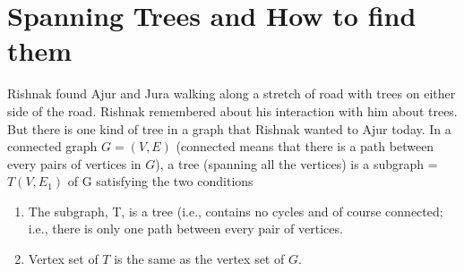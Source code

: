 \chapter{Spanning Trees and How to find them}
Rishnak found Ajur and Jura walking along a stretch of road with trees on either side of the road. Rishnak remembered about his interaction with him about trees. But there is one kind of tree in a graph that Rishnak wanted to Ajur today.
In a connected graph $G=(V,E)$ (connected means that there is a path between every pairs of vertices in $G$), a tree (spanning all the vertices) is a subgraph =$T(V,E_1)$ of G satisfying the two conditions
\begin{enumerate}
    \item The subgraph, T,  is a tree (i.e., contains no cycles and of course connected; i.e., there is only one path between every pair of vertices.
    \item Vertex set of $T$ is the same as the vertex set of $G$.
\end{enumerate}

